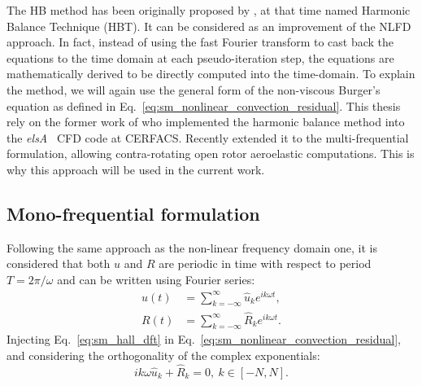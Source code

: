
The HB method has been originally
proposed by \citet{Hall2002}, at that time named
Harmonic Balance Technique (HBT).
It can be considered as an improvement of the NLFD
approach. In fact, instead
of using the fast Fourier transform to cast back the equations
to the time domain at each pseudo-iteration step, 
the equations are mathematically derived to be directly
computed into the time-domain.
To explain the method, we will again use the general form of 
the non-viscous Burger's equation as defined in
Eq.~\eqref{eq:sm_nonlinear_convection_residual}.
This thesis rely on the former work of \citet{ThesisSicot} who
implemented the harmonic balance method into the 
\textit{elsA}~\cite{Cambier2013} CFD code at CERFACS. 
Recently \citet{ThesisGuedeney} extended it to the
multi-frequential formulation, allowing contra-rotating
open rotor aeroelastic computations. This is why this
approach will be used in the current work.

\subsection{Mono-frequential formulation}

Following the same approach as the non-linear frequency domain one,
it is considered that both $u$ and $R$ are periodic
in time with respect to period $T = 2 \pi / \omega$
and can be written using Fourier series:
\begin{equation}
	\begin{split}
		u(t) &= \sum_{k=-\infty}^{\infty} \widehat{u}_k e^{i k \omega t}, \\
		R(t) &= \sum_{k=-\infty}^{\infty} \widehat{R}_k e^{i k \omega t}.
		\label{eq:sm_hall_dft}
	\end{split}
\end{equation}
Injecting Eq.~\eqref{eq:sm_hall_dft} in 
Eq.~\eqref{eq:sm_nonlinear_convection_residual}, and considering
the orthogonality of the complex exponentials:
\begin{equation}
	i k \omega \widehat{u}_k + \widehat{R}_k = 0, \: k \in [-N, N].
	\label{eq:sm_hall_frequential_eq}
\end{equation}

